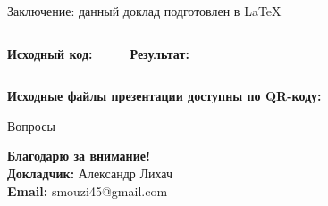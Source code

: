 \begin{frame}[fragile,label=conclusion]{Заключение: данный доклад подготовлен в \LaTeX}
  \begin{columns}[T,onlytextwidth]
      \textbf{Исходный код:}
      \vspace{0.2em}
      \inputminted[fontsize=\scriptsize, frame=single, breaklines=true]{latex}{examples/conclusion.tex}

      \textbf{Результат:}
      \vspace{0.2em}
      
  \end{columns}

  \vspace{1em}
  \centering
  \textbf{Исходные файлы презентации доступны по QR-коду:}\\
  \vspace{0.3em}
  
\end{frame}

\begin{frame}[label=questions]{Вопросы}
  \begin{center}
    \Large
    \textbf{Благодарю за внимание!}\\
    \vspace{1em}
    \normalsize
    \textbf{Докладчик:} Александр Лихач\\
    \textbf{Email:} smouzi45@gmail.com
  \end{center}
\end{frame}